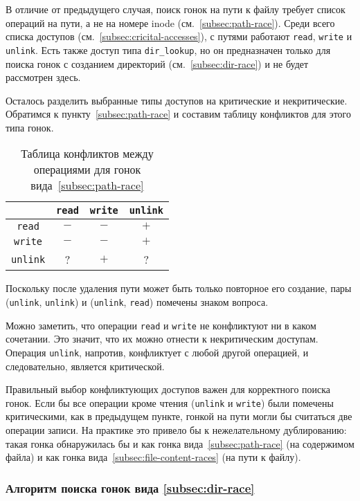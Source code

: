 В отличие от предыдущего случая, поиск гонок на пути к файлу требует список операций на пути, а не на номере inode (см.~\ref{subsec:path-race}). Среди всего списка доступов (см.~\ref{subsec:cricital-accesses}), с путями работают \texttt{read}, \texttt{write} и \texttt{unlink}. Есть также доступ типа \texttt{dir\_lookup}, но он предназначен только для поиска гонок с созданием директорий (см.~\ref{subsec:dir-race}) и не будет рассмотрен здесь.

Осталось разделить выбранные типы доступов на критические и некритические. Обратимся к пункту~\ref{subsec:path-race} и составим таблицу конфликтов для этого типа гонок.

\begin{table}[htbp]
    \centering
    \begin{tabular}{cccc}
        \toprule
        & \texttt{read} & \texttt{write} & \texttt{unlink} \\
        \midrule
        \texttt{read} & $-$ & $-$ & $+$\\
        \texttt{write} & $-$ & $-$ & $+$\\
        \texttt{unlink} & ? & $+$ & ?\\
        \bottomrule
    \end{tabular}
    \caption{Таблица конфликтов между операциями для гонок вида~\ref{subsec:path-race}}
    \label{tab:conflict-table-path-race}
\end{table}

Поскольку после удаления пути может быть только повторное его создание, пары (\texttt{unlink}, \texttt{unlink}) и (\texttt{unlink}, \texttt{read}) помечены знаком вопроса.

Можно заметить, что операции \texttt{read} и \texttt{write} не конфликтуют ни в каком сочетании. Это значит, что их можно отнести к некритическим доступам. Операция \texttt{unlink}, напротив, конфликтует с любой другой операцией, и следовательно, является критической.

Правильный выбор конфликтующих доступов важен для корректного поиска гонок. Если бы все операции кроме чтения (\texttt{unlink} и \texttt{write}) были помечены критическими, как в предыдущем пункте, гонкой на пути могли бы считаться две операции записи. На практике это привело бы к нежелательному дублированию: такая гонка обнаружилась бы и как гонка вида~\ref{subsec:path-race} (на содержимом файла) и как гонка вида~\ref{subsec:file-content-races} (на пути к файлу).

\subsubsection{Алгоритм поиска гонок вида \ref{subsec:dir-race}}

